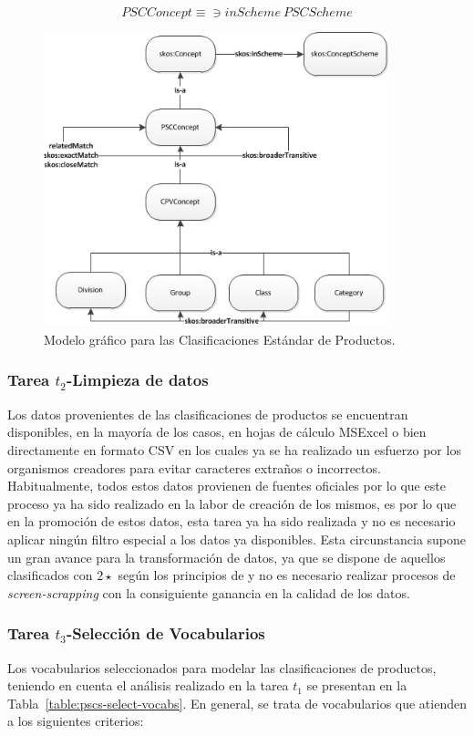 \begin{equation}
 PSCConcept \equiv\ni inScheme~PSCScheme
\end{equation}


\begin{figure}[!htp]
 \centering
	 \includegraphics[width=10cm]{images/phd/modelo/pscs-model}
	\caption{Modelo gráfico para las Clasificaciones Estándar de Productos.}
	\label{fig:modelo-grafico-pscs}
\end{figure}



\subsubsection{Tarea $t_2$-Limpieza de datos}
Los datos provenientes de las clasificaciones de productos se encuentran disponibles, en la mayoría de los casos, 
en hojas de cálculo MSExcel o bien directamente en formato \gls{CSV} en los cuales ya se ha realizado un esfuerzo por los organismos 
creadores para evitar caracteres extraños o incorrectos. Habitualmente, todos estos datos provienen de fuentes oficiales por lo que
este proceso ya ha sido realizado en la labor de creación de los mismos, es por lo que en la promoción de estos datos, esta tarea
ya ha sido realizada y no es necesario aplicar ningún filtro especial a los datos ya disponibles. Esta circunstancia supone 
un gran avance para la transformación de datos, ya que se dispone de aquellos clasificados con $2\star$ según los principios de \linkeddata y no 
es necesario realizar procesos de \textit{screen-scrapping} con la consiguiente ganancia en la calidad de los datos.

\subsubsection{Tarea $t_3$-Selección de Vocabularios}
Los vocabularios seleccionados para modelar las clasificaciones de productos, teniendo en cuenta el análisis 
realizado en la tarea $t_1$ se presentan en la Tabla~\ref{table:pscs-select-vocabs}. En general, se trata de vocabularios 
que atienden a los siguientes criterios:

